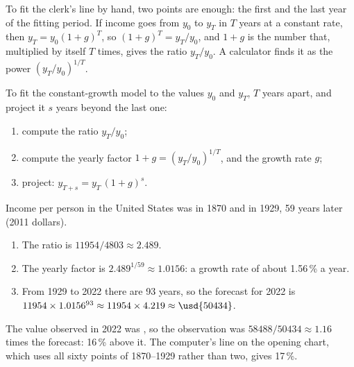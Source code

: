 To fit the clerk's line by hand, two points are enough: the first and the last year of the fitting
period. If income goes from $y_0$ to $y_T$ in $T$ years at a constant rate, then $y_T = y_0(1+g)^T$,
so $(1+g)^T = y_T/y_0$, and $1+g$ is the number that, multiplied by itself $T$ times, gives the
ratio $y_T/y_0$. A calculator finds it as the power $(y_T/y_0)^{1/T}$.

\begin{method}\label{met:g10:economic-models:two-points}
To fit the constant-growth model to the values $y_0$ and $y_T$, $T$ years apart, and project it $s$
years beyond the last one:
\begin{enumerate}
\item compute the ratio $y_T / y_0$;
\item compute the yearly factor $1 + g = (y_T/y_0)^{1/T}$, and the growth rate $g$;
\item project: $y_{T+s} = y_T\,(1+g)^s$.
\end{enumerate}
\end{method}

\begin{example}\label{ex:g10:economic-models:us}
Income per person in the United States was  in 1870 and  in 1929, 59 years
later (2011 dollars).
\begin{enumerate}
\item The ratio is $11954 / 4803 \approx 2.489$.
\item The yearly factor is $2.489^{1/59} \approx 1.0156$: a growth rate of about 1.56\,\% a year.
\item From 1929 to 2022 there are 93 years, so the forecast for 2022 is $11954 \times 1.0156^{93}
  \approx 11954 \times 4.219 \approx \usd{50434}$.
\end{enumerate}
The value observed in 2022 was , so the observation was $58488 / 50434 \approx 1.16$
times the forecast: 16\,\% above it. The computer's line on the opening chart, which uses all sixty
points of 1870--1929 rather than two, gives 17\,\%.
\end{example}

